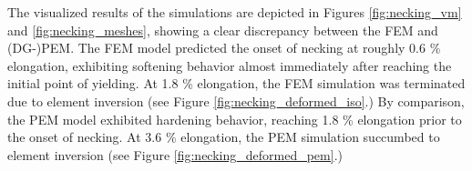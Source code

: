 
The visualized results of the simulations are depicted in Figures \ref{fig:necking_vm} and \ref{fig:necking_meshes}, showing a clear discrepancy between the FEM and (DG-)PEM. The FEM model predicted the onset of necking at roughly 0.6 \% elongation, exhibiting softening behavior almost immediately after reaching the initial point of yielding. At 1.8 \% elongation, the FEM simulation was terminated due to element inversion (see Figure \ref{fig:necking_deformed_iso}.) By comparison, the PEM model exhibited hardening behavior, reaching 1.8 \% elongation prior to the onset of necking. At 3.6 \% elongation, the PEM simulation succumbed to element inversion (see Figure \ref{fig:necking_deformed_pem}.)

